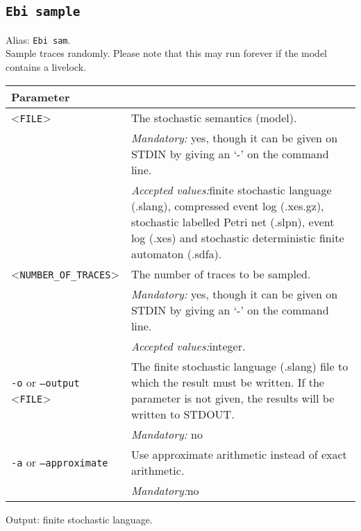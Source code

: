 {\subsection{\texttt{Ebi sample}}
\label{command:Ebi sample}
Alias: \texttt{Ebi sam}.\\
Sample traces randomly. Please note that this may run forever if the model contains a livelock.\\
\begin{tabularx}{\linewidth}{lX}
\toprule
Parameter \\\midrule
<\texttt{FILE}>&The stochastic semantics (model).\\
&\textit{Mandatory:} \quad yes, though it can be given on STDIN by giving an `-' on the command line.\\
&\textit{Accepted values:}\quad finite stochastic language (.slang), compressed event log (.xes.gz), stochastic labelled Petri net (.slpn), event log (.xes) and stochastic deterministic finite automaton (.sdfa).\\
<\texttt{NUMBER\_OF\_TRACES}>&The number of traces to be sampled.\\
&\textit{Mandatory:} \quad yes, though it can be given on STDIN by giving an `-' on the command line.\\
&\textit{Accepted values:}\quad integer.\\
\texttt{-o} or \texttt{--output} <\texttt{FILE}> &
The finite stochastic language (.slang) file to which the result must be written. If the parameter is not given, the results will be written to STDOUT.\\
&\textit{Mandatory:} \quad no\\
\texttt{-a} or \texttt{--approximate} & Use approximate arithmetic instead of exact arithmetic.\\
&\textit{Mandatory:}\quad no\\
\bottomrule
\end{tabularx}
Output: finite stochastic language.
}
